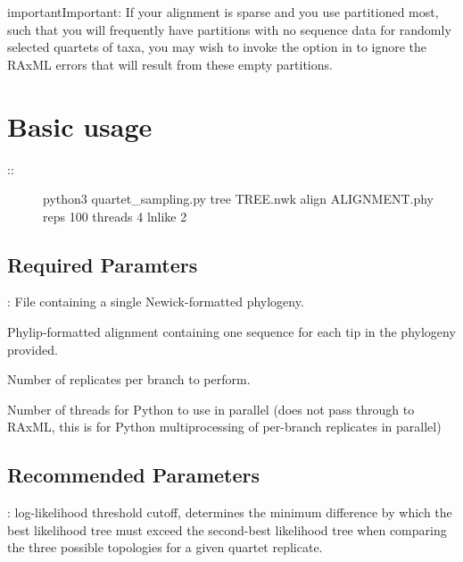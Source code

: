 \documentclass[letterpaper,12pt,english]{sphinxmanual}
\begin{document}
\begin{sphinxadmonition}{important}{Important:}
If your alignment is sparse and you use partitioned most, such that you will frequently have partitions with no sequence data for randomly selected quartets of taxa, you may wish to invoke the  option in  to ignore the RAxML errors that will result from these empty partitions.
\end{sphinxadmonition}


\section{Basic usage}
\label{\detokenize{intro:basic-usage}}\begin{description}
\item[{::}] \leavevmode
python3 quartet\_sampling.py \textendash{}tree TREE.nwk \textendash{}align ALIGNMENT.phy \textendash{}reps 100 \textendash{}threads 4 \textendash{}lnlike 2

\end{description}


\subsection{Required Paramters}
\label{\detokenize{intro:required-paramters}}
: File containing a single Newick-formatted phylogeny.

 Phylip-formatted alignment containing one sequence for each tip in the phylogeny provided.

 Number of replicates per branch to perform.

 Number of threads for Python to use in parallel (does not pass through to RAxML, this is for Python multiprocessing of per-branch replicates in parallel)


\subsection{Recommended Parameters}
\label{\detokenize{intro:recommended-parameters}}
: log-likelihood threshold cutoff, determines the minimum difference by which the best likelihood tree must exceed the second-best likelihood tree when comparing the three possible topologies for a given quartet replicate.
\end{document}
